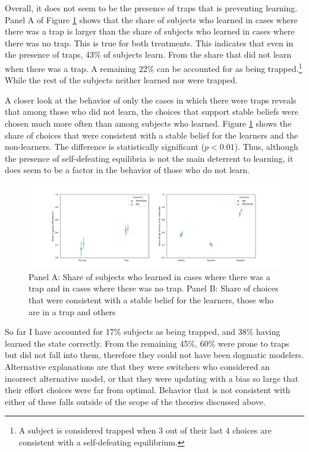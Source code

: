 \documentclass[
  12pt,
]{article}
\begin{document}
Overall, it does not seem to be the presence of traps that is preventing
learning. Panel A of Figure \ref{fig:traps-choice} shows that the share
of subjects who learned in cases where there was a trap is larger than
the share of subjects who learned in cases where there was no trap. This
is true for both treatments. This indicates that even in the presence of
traps, 43\% of subjects learn. From the share that did not learn when
there was a trap. A remaining 22\% can be accounted for as being
trapped.\footnote{A subject is considered trapped when 3 out of their last 4 choices are consistent with 
a self-defeating equilibrium.} While the rest of the subjects neither
learned nor were trapped.

A closer look at the behavior of only the cases in which there were
traps reveals that among those who did not learn, the choices that
support stable beliefs were chosen much more often than among subjects
who learned. Figure \ref{fig:traps-choice} shows the share of choices
that were consistent with a stable belief for the learners and the
non-learners. The difference is statistically significant (\(p<0.01\)).
Thus, although the presence of self-defeating equilibria is not the main
deterrent to learning, it does seem to be a factor in the behavior of
those who do not learn.

\begin{figure}
\hypertarget{fig:traps-choice}{%
\centering
\includegraphics{../figures/trap_choice.png}
\caption{Panel A: Share of subjects who learned in cases where there was
a trap and in cases where there was no trap. Panel B: Share of choices
that were consistent with a stable belief for the learners, those who
are in a trap and others}\label{fig:traps-choice}
}
\end{figure}

So far I have accounted for 17\% subjects as being trapped, and 38\%
having learned the state correctly. From the remaining 45\%, 60\% were
prone to traps but did not fall into them, therefore they could not have
been dogmatic modelers. Alternative explanations are that they were
switchers who considered an incorrect alternative model, or that they
were updating with a bias so large that their effort choices were far
from optimal. Behavior that is not consistent with either of these falls
outside of the scope of the theories discussed above.
\end{document}
